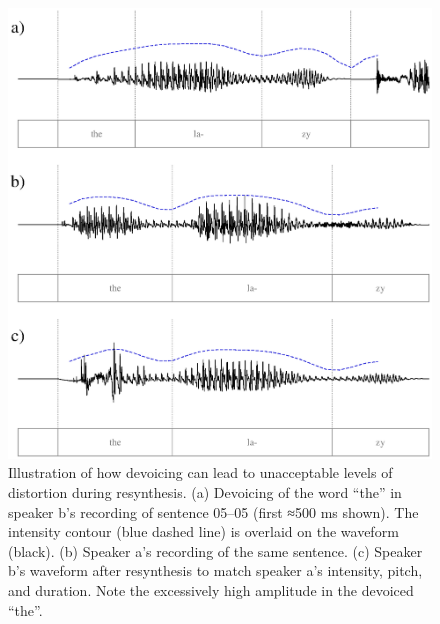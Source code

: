 \begin{figure}
	\begin{centering}
	\includegraphics{figures/devoicing/devoicing.eps}
	\caption[Syllable devoicing in resynthesis]{Illustration of how devoicing can lead to unacceptable levels of distortion during resynthesis.  (a) Devoicing of the word “the” in speaker \ac{b}’s recording of sentence 05–05 (first ≈500 ms shown).  The intensity contour (blue dashed line) is overlaid on the waveform (black).  (b) Speaker \ac{a}’s recording of the same sentence.  (c) Speaker \ac{b}’s waveform after resynthesis to match speaker \ac{a}’s intensity, pitch, and duration.  Note the excessively high amplitude in the devoiced “the”.\label{fig:Devoicing}}
	\end{centering}
\end{figure}

